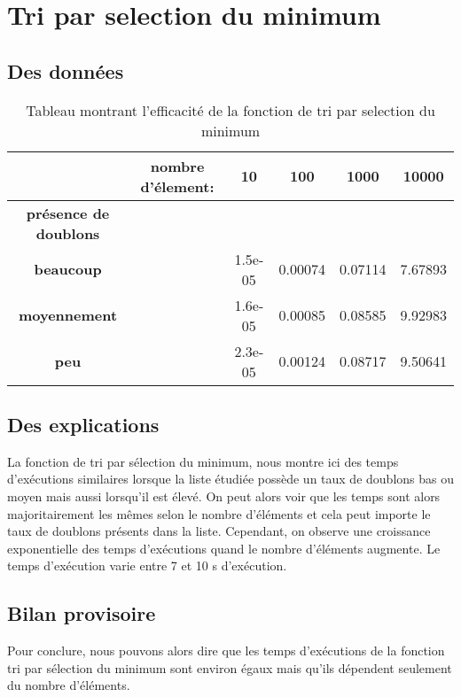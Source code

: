 \documentclass[a4paper, 12pt]{article}
\begin{document}
\section{Tri par selection du minimum}
\subsection{Des données}

\begin{table}[htbp]
  \centering
  \begin{tabular}{||c c|c|c|c|c||}\hline
    \textbf{} & \textbf{nombre d'élement:} & \textbf{10} & \textbf{100} & \textbf{1000} & \textbf{10000}\\\hline\hline
    \textbf{présence de doublons} & 	& 	& 	& 	&\\\hline
    \textbf{beaucoup}           &	   & 1.5e-05     & 0.00074	& 0.07114	& 7.67893    \\\hline
    \textbf{moyennement}        &  	   & 1.6e-05     & 0.00085      & 0.08585	& 9.92983    \\\hline
    \textbf{peu}         	&          & 2.3e-05     & 0.00124      & 0.08717	& 9.50641    \\\hline
  \end{tabular}
  \caption{Tableau montrant l'efficacité de la fonction de tri par selection du minimum}
  \label{montableau2}
\end{table}

\subsection{Des explications}

La fonction de tri par sélection du minimum, nous montre ici des temps d’exécutions similaires lorsque la liste étudiée possède un taux de doublons bas ou moyen mais aussi lorsqu’il est élevé. On peut alors voir que les temps sont alors majoritairement les mêmes selon le nombre d’éléments et cela peut importe le taux de doublons présents dans la liste. Cependant, on observe une croissance exponentielle des temps d’exécutions quand le nombre d’éléments augmente. Le temps d’exécution varie entre 7 et 10 s d’exécution. 

\subsection{Bilan provisoire}

Pour conclure, nous pouvons alors dire que les temps d’exécutions de la fonction tri par sélection du minimum sont environ égaux mais qu’ils dépendent seulement du nombre d’éléments.
\end{document}
